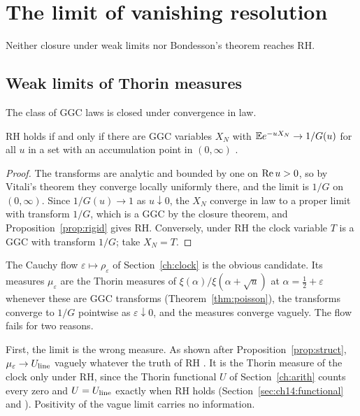 \section{The limit of vanishing resolution}\label{ch:weak}

Neither closure under weak limits nor Bondesson's theorem reaches RH.

\subsection{Weak limits of Thorin measures}\label{sec:weak:limits}

\begin{theorem}
The class of GGC laws is closed under convergence in law.
\end{theorem}

\begin{corollary}\label{cor:weak:closure}
RH holds if and only if there are GGC variables $X_N$ with $\mathbb{E} e^{-uX_N}\to1/G(u)$ for all $u$ in a set with an accumulation point in $(0,\infty)$ \cite[Propositions 18.10 and 18.14]{P26}.
\end{corollary}

\begin{proof}
The transforms are analytic and bounded by one on $\operatorname{Re} u>0$, so by Vitali's theorem they converge locally uniformly there, and the limit is $1/G$ on $(0,\infty)$. Since $1/G(u)\to1$ as $u\downarrow0$, the $X_N$ converge in law to a proper limit with transform $1/G$, which is a GGC by the closure theorem, and Proposition~\ref{prop:rigid} gives RH. Conversely, under RH the clock variable $T$ is a GGC with transform $1/G$; take $X_N=T$.
\end{proof}

The Cauchy flow $\varepsilon\mapsto\rho_\varepsilon$ of Section~\ref{ch:clock} is the obvious candidate. Its measures $\mu_\varepsilon$ are the Thorin measures of $\xi(\alpha)/\xi(\alpha+\sqrt u)$ at $\alpha=\tfrac12+\varepsilon$ whenever these are GGC transforms (Theorem~\ref{thm:poisson}), the transforms converge to $1/G$ pointwise as $\varepsilon\downarrow0$, and the measures converge vaguely. The flow fails for two reasons.

First, the limit is the wrong measure. As shown after Proposition~\ref{prop:struct}, $\mu_\varepsilon\to U_{\rm line}$ vaguely whatever the truth of RH \cite[Proposition 9.5]{P17}. It is the Thorin measure of the clock only under RH, since the Thorin functional $U$ of Section~\ref{ch:arith} counts every zero and $U=U_{\rm line}$ exactly when RH holds (Section~\ref{sec:ch14:functional} and \cite[Proposition 7.6]{P26}). Positivity of the vague limit carries no information.

